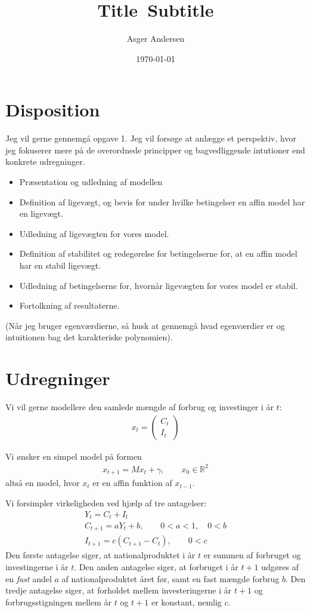\documentclass[12pt]{article}
\title{
  Title\
  \large Subtitle
}
\author{Asger Andersen}
\date{\today}
\begin{document}
\section{Disposition}

Jeg vil gerne gennemgå opgave 1. Jeg vil forsøge at anlægge et perspektiv, hvor jeg fokuserer mere på de overordnede principper og bagvedliggende intutioner end konkrete udregninger.

\begin{itemize}
\item Præsentation og udledning af modellen
\item Definition af ligevægt, og bevis for under hvilke betingelser en affin model har en ligevægt.
\item Udledning af ligevægten for vores model.
\item Definition af stabilitet og redegørelse for betingelserne for, at en affin model har en stabil ligevægt.
\item Udledning af betingelserne for, hvornår ligevægten for vores model er stabil.
\item Fortolkning af resultaterne.
\end{itemize}

(Når jeg bruger egenværdierne, så husk at gennemgå hvad egenværdier er og intuitionen bag det karakteriske polynomien).

 \section{Udregninger}

Vi vil gerne modellere den samlede mængde af forbrug og investinger i år $t$:
\begin{align}
x_t = \begin{pmatrix}
C_t \\ I_t
\end{pmatrix}
\end{align} 

Vi ønsker en simpel model på formen
\begin{align}
x_{t+1} = Mx_t + \gamma, \qquad x_0\in \mathbb{R}^2
\end{align}
altså en model, hvor $x_t$ er en affin funktion af $x_{t-1}$.

Vi forsimpler virkeligheden ved hjælp af tre antagelser:
\begin{align}
Y_t = C_t + I_t \\
C_{t+1} = aY_t + b,\qquad 0<a<1, \quad 0<b \\
I_{t+1} = c(C_{t+1} - C_t), \qquad 0<c
\end{align}
Den første antagelse siger, at nationalproduktet i år $t$ er summen af forbruget og investingerne i år $t$. Den anden antagelse siger, at forbruget i år $t+1$ udgøres af en \textit{fast} andel $a$
af nationalproduktet året før, samt en fast mængde forbrug $b$. Den tredje antagelse siger, at forholdet mellem investeringerne i år $t+1$ og forbrugsstigningen mellem år $t$ og $t+1$ er konstant, nemlig $c$.
\end{document}
